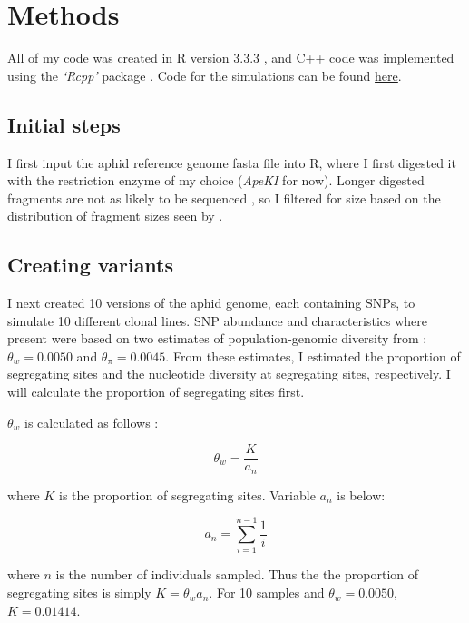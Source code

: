 
\section{Methods}


All of my code was created in R version 3.3.3 \citep{RCoreTeam:2014wf}, and C++ code was 
implemented using the \emph{`Rcpp'} package \citep{Eddelbuettel:2013if}.
Code for the simulations can be found \href{https://github.com/lucasnell/mol_ecol}{here}.

\subsection{Initial steps}

I first input the aphid reference genome fasta file into R, where I first digested it 
with the restriction enzyme of my choice (\emph{ApeKI} for now).
Longer digested fragments are not as likely to be sequenced 
\citep{Andrews:2016bc,Elshire:2011gn}, so I filtered for size based on the distribution 
of fragment sizes seen by \citet{Elshire:2011gn}.


\subsection{Creating variants}

I next created 10 versions of the aphid genome, each containing SNPs, to simulate
10 different clonal lines.
SNP abundance and characteristics where present were based on two estimates of 
population-genomic diversity from \citet{Bickel:2013hy}: $\theta_w = 0.0050$ and 
$\theta_{\pi} = 0.0045$.
From these estimates, I estimated the proportion of segregating sites and the nucleotide 
diversity at segregating sites, respectively. 
I will calculate the proportion of segregating sites first.

$\theta_w$ is calculated as follows \citep{Watterson:1975bh}:

\begin{equation} \label{eq:watterson} 
    \theta_w = \frac{ K }{ a_n }
\end{equation}

where $K$ is the proportion of segregating sites. Variable $a_n$ is below:

\begin{equation} \label{eq:a_n}
    a_n = \sum_{i=1}^{n-1} \frac{1}{i}
\end{equation}

where $n$ is the number of individuals sampled.
Thus the the proportion of segregating sites is simply $K = \theta_w a_n$.
For 10 samples and $\theta_w = 0.0050$, $K = 0.01414$.

